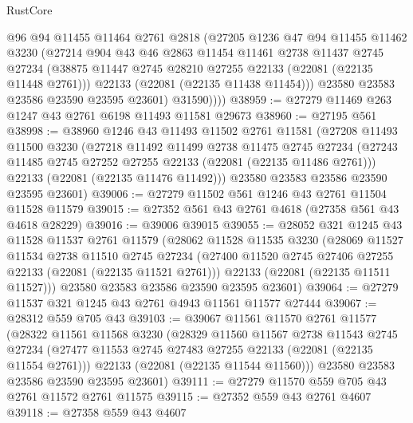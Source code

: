 \begin{lexlean}{RustCore}
\begin{coremodule}
            @96
            @94
            @11455
            @11464
            @2761
            @2818
            (@27205
              @1236
              @47
              @94
              @11455
              @11462
              @3230
              (@27214
                @904
                @43
                @46
                @2863
                @11454
                @11461
                @2738
                @11437
                @2745
                @27234
                (@38875 @11447 @2745 @28210 @27255 @22133 (@22081 (@22135 @11448 @2761)))
                @22133
                (@22081 (@22135 @11438 @11454)))
              @23580
              @23583
              @23586
              @23590
              @23595
              @23601)
            @31590))))
@38959 := @27279 @11469 @263 @1247 @43 @2761 @6198 @11493 @11581 @29673
@38960 := @27195 @561
@38998 := @38960
    @1246
    @43
    @11493
    @11502
    @2761
    @11581
    (@27208
      @11493
      @11500
      @3230
      (@27218
        @11492
        @11499
        @2738
        @11475
        @2745
        @27234
        (@27243 @11485 @2745 @27252 @27255 @22133 (@22081 (@22135 @11486 @2761)))
        @22133
        (@22081 (@22135 @11476 @11492)))
      @23580
      @23583
      @23586
      @23590
      @23595
      @23601)
@39006 := @27279 @11502 @561 @1246 @43 @2761 @11504 @11528 @11579
@39015 := @27352 @561 @43 @2761 @4618 (@27358 @561 @43 @4618 @28229)
@39016 := @39006 @39015
@39055 := @28052
    @321
    @1245
    @43
    @11528
    @11537
    @2761
    @11579
    (@28062
      @11528
      @11535
      @3230
      (@28069
        @11527
        @11534
        @2738
        @11510
        @2745
        @27234
        (@27400 @11520 @2745 @27406 @27255 @22133 (@22081 (@22135 @11521 @2761)))
        @22133
        (@22081 (@22135 @11511 @11527)))
      @23580
      @23583
      @23586
      @23590
      @23595
      @23601)
@39064 := @27279 @11537 @321 @1245 @43 @2761 @4943 @11561 @11577 @27444
@39067 := @28312 @559 @705 @43
@39103 := @39067
    @11561
    @11570
    @2761
    @11577
    (@28322
      @11561
      @11568
      @3230
      (@28329
        @11560
        @11567
        @2738
        @11543
        @2745
        @27234
        (@27477 @11553 @2745 @27483 @27255 @22133 (@22081 (@22135 @11554 @2761)))
        @22133
        (@22081 (@22135 @11544 @11560)))
      @23580
      @23583
      @23586
      @23590
      @23595
      @23601)
@39111 := @27279 @11570 @559 @705 @43 @2761 @11572 @2761 @11575
@39115 := @27352 @559 @43 @2761 @4607
@39118 := @27358 @559 @43 @4607

\end{coremodule}
\end{lexlean}
